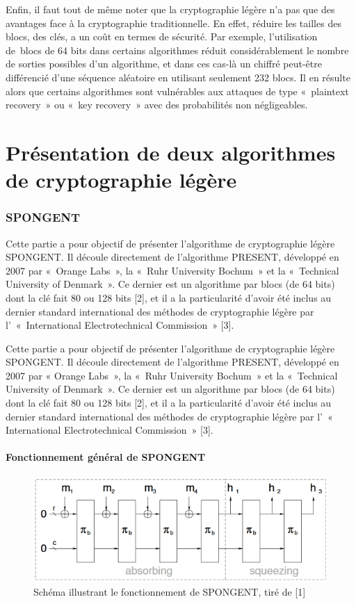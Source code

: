 	Enfin, il faut tout de même noter que la cryptographie légère n’a pas que des
	avantages face à la cryptographie traditionnelle. En effet, réduire les
	tailles des blocs, des clés, a un coût en termes de sécurité. Par exemple,
	l’utilisation de blocs de 64 bits dans certains algorithmes réduit
	considérablement le nombre de sorties possibles d’un algorithme, et dans ces
	cas-là un chiffré peut-être différencié d’une séquence aléatoire en utilisant
	seulement 232 blocs. Il en résulte alors que certains algorithmes sont
	vulnérables aux attaques de type « plaintext recovery » ou « key recovery »
	avec des probabilités non négligeables.


\part{Présentation de deux algorithmes de cryptographie légère}

	\section{SPONGENT}
	Cette partie a pour objectif de présenter l’algorithme de cryptographie légère SPONGENT.
	Il découle directement de l’algorithme PRESENT, développé en 2007 par « Orange Labs », la « Ruhr University Bochum » et la « Technical  University of Denmark ».
	Ce dernier est un algorithme par blocs (de 64 bits) dont la clé fait 80 ou 128 bits [2],
	et il a la particularité d’avoir été inclus au dernier standard international des méthodes de cryptographie légère par l’ « International Electrotechnical Commission » [3].

			Cette partie a pour objectif de présenter l’algorithme de cryptographie légère
		SPONGENT. Il découle directement de l’algorithme PRESENT, développé en 2007 par «
		Orange Labs », la « Ruhr University Bochum » et la « Technical  University of
		Denmark ». Ce dernier est un algorithme par blocs (de 64 bits) dont la clé fait
		80 ou 128 bits [2], et il a la particularité d’avoir été inclus au dernier
		standard international des méthodes de cryptographie légère par l’ «
		International Electrotechnical Commission » [3].

		\subsection{Fonctionnement général de SPONGENT}

		\begin{figure}[h]
			 	\centering
			 	\includegraphics[width=\textwidth]{imgs/Spongent/fctGlobalSpongent.png}
			 	\caption{Schéma illustrant le fonctionnement de SPONGENT, tiré de [1]}
			 	\label{fctGlobalSpongent}
		\end{figure}

